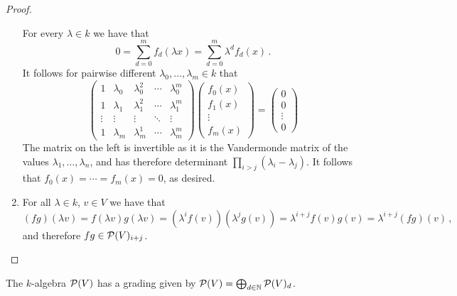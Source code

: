 \begin{proof}
\begin{enumerate}
      For every $\lambda \in k$ we have that
      \[
          0
        = \sum_{d=0}^m f_d(\lambda x)
        = \sum_{d=0}^m \lambda^d f_d(x) \,.
      \]
      It follows for pairwise different $\lambda_0, \dotsc, \lambda_m \in k$ that
      \[
          \begin{pmatrix}
              1
            & \lambda_0
            & \lambda_0^2
            & \cdots
            & \lambda_0^m
            \\
              1
            & \lambda_1
            & \lambda_1^2
            & \cdots
            & \lambda_1^m
            \\
              \vdots
            & \vdots
            & \vdots
            & \ddots
            & \vdots
            \\
              1
            & \lambda_m
            & \lambda_m^1
            & \cdots
            & \lambda_m^m
          \end{pmatrix}
          \begin{pmatrix}
            f_0(x)  \\
            f_1(x)  \\
            \vdots  \\
            f_m(x)
          \end{pmatrix}
        = \begin{pmatrix}
            0       \\
            0       \\
            \vdots  \\
            0
          \end{pmatrix}
      \]
      The matrix on the left is invertible as it is the Vandermonde matrix of the values $\lambda_1, \dotsc, \lambda_n$, and has therefore determinant $\prod_{i > j} (\lambda_i - \lambda_j)$.
      It follows that $f_0(x) = \dotsb = f_m(x) = 0$, as desired.
    \item
      For all $\lambda \in k$, $v \in V$ we have that
      \[
          (fg)(\lambda v)
        = f(\lambda v) g(\lambda v)
        = \left( \lambda^i f(v) \right)\left( \lambda^j g(v) \right)
        = \lambda^{i+j} f(v) g(v)
        = \lambda^{i+j} (fg)(v) \,,
      \]
      and therefore $fg \in \mathcal{P}(V)_{i+j}$.
    \qedhere
  \end{enumerate}
\end{proof}


\begin{corollary}
  The $k$-algebra $\mathcal{P}(V)$ has a grading given by $\mathcal{P}(V) = \bigoplus_{d \in \mathbb{N}} \mathcal{P}(V)_d$.
\end{corollary}


